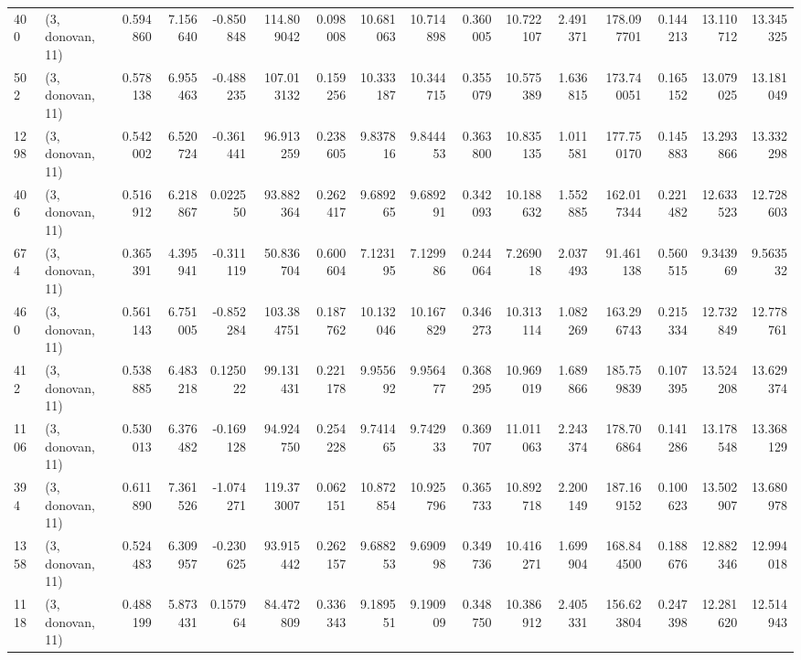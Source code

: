 \begin{tabular}{llrrrrrrrrrrrrrr}
400  &  (3, donovan, 11) &   0.594860 &   7.156640 &  -0.850848 &    114.809042 &    0.098008 &   10.681063 &   10.714898 &  0.360005 &  10.722107 &   2.491371 &   178.097701 &   0.144213 &  13.110712 &  13.345325 \\
502  &  (3, donovan, 11) &   0.578138 &   6.955463 &  -0.488235 &    107.013132 &    0.159256 &   10.333187 &   10.344715 &  0.355079 &  10.575389 &   1.636815 &   173.740051 &   0.165152 &  13.079025 &  13.181049 \\
1298 &  (3, donovan, 11) &   0.542002 &   6.520724 &  -0.361441 &     96.913259 &    0.238605 &    9.837816 &    9.844453 &  0.363800 &  10.835135 &   1.011581 &   177.750170 &   0.145883 &  13.293866 &  13.332298 \\
406  &  (3, donovan, 11) &   0.516912 &   6.218867 &   0.022550 &     93.882364 &    0.262417 &    9.689265 &    9.689291 &  0.342093 &  10.188632 &   1.552885 &   162.017344 &   0.221482 &  12.633523 &  12.728603 \\
674  &  (3, donovan, 11) &   0.365391 &   4.395941 &  -0.311119 &     50.836704 &    0.600604 &    7.123195 &    7.129986 &  0.244064 &   7.269018 &   2.037493 &    91.461138 &   0.560515 &   9.343969 &   9.563532 \\
460  &  (3, donovan, 11) &   0.561143 &   6.751005 &  -0.852284 &    103.384751 &    0.187762 &   10.132046 &   10.167829 &  0.346273 &  10.313114 &   1.082269 &   163.296743 &   0.215334 &  12.732849 &  12.778761 \\
412  &  (3, donovan, 11) &   0.538885 &   6.483218 &   0.125022 &     99.131431 &    0.221178 &    9.955692 &    9.956477 &  0.368295 &  10.969019 &   1.689866 &   185.759839 &   0.107395 &  13.524208 &  13.629374 \\
1106 &  (3, donovan, 11) &   0.530013 &   6.376482 &  -0.169128 &     94.924750 &    0.254228 &    9.741465 &    9.742933 &  0.369707 &  11.011063 &   2.243374 &   178.706864 &   0.141286 &  13.178548 &  13.368129 \\
394  &  (3, donovan, 11) &   0.611890 &   7.361526 &  -1.074271 &    119.373007 &    0.062151 &   10.872854 &   10.925796 &  0.365733 &  10.892718 &   2.200149 &   187.169152 &   0.100623 &  13.502907 &  13.680978 \\
1358 &  (3, donovan, 11) &   0.524483 &   6.309957 &  -0.230625 &     93.915442 &    0.262157 &    9.688253 &    9.690998 &  0.349736 &  10.416271 &   1.699904 &   168.844500 &   0.188676 &  12.882346 &  12.994018 \\
1118 &  (3, donovan, 11) &   0.488199 &   5.873431 &   0.157964 &     84.472809 &    0.336343 &    9.189551 &    9.190909 &  0.348750 &  10.386912 &   2.405331 &   156.623804 &   0.247398 &  12.281620 &  12.514943 \\

\end{tabular}
